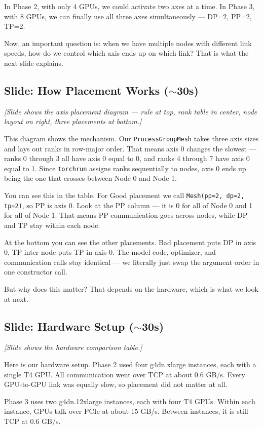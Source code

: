 \documentclass[11pt, a4paper]{article}
\begin{document}
In Phase 2, with only 4 GPUs, we could activate two axes at a time. In Phase 3, with 8 GPUs, we can finally use all three axes simultaneously --- DP=2, PP=2, TP=2.

Now, an important question is: when we have multiple nodes with different link speeds, how do we control which axis ends up on which link? That is what the next slide explains.

\subsection{Slide: How Placement Works ($\sim$30s)}
\textit{[Slide shows the axis placement diagram --- rule at top, rank table in center, node layout on right, three placements at bottom.]}

This diagram shows the mechanism. Our \texttt{ProcessGroupMesh} takes three axis sizes and lays out ranks in row-major order. That means axis 0 changes the slowest --- ranks 0 through 3 all have axis 0 equal to 0, and ranks 4 through 7 have axis 0 equal to 1. Since \texttt{torchrun} assigns ranks sequentially to nodes, axis 0 ends up being the one that crosses between Node 0 and Node 1.

You can see this in the table. For Good placement we call \texttt{Mesh(pp=2, dp=2, tp=2)}, so PP is axis 0. Look at the PP column --- it is 0 for all of Node 0 and 1 for all of Node 1. That means PP communication goes across nodes, while DP and TP stay within each node.

At the bottom you can see the other placements. Bad placement puts DP in axis 0, TP inter-node puts TP in axis 0. The model code, optimizer, and communication calls stay identical --- we literally just swap the argument order in one constructor call.

But why does this matter? That depends on the hardware, which is what we look at next.

\subsection{Slide: Hardware Setup ($\sim$30s)}
\textit{[Slide shows the hardware comparison table.]}

Here is our hardware setup. Phase 2 used four g4dn.xlarge instances, each with a single T4 GPU. All communication went over TCP at about 0.6 GB/s. Every GPU-to-GPU link was equally slow, so placement did not matter at all.

Phase 3 uses two g4dn.12xlarge instances, each with four T4 GPUs. Within each instance, GPUs talk over PCIe at about 15 GB/s. Between instances, it is still TCP at 0.6 GB/s.
\end{document}
